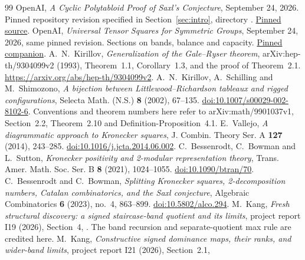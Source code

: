 \documentclass[11pt]{article}
\theoremstyle{remark}\newtheorem{remark}[theorem]{Remark}
\numberwithin{equation}{section}\setlength{\emergencystretch}{2em}
\begin{document}
\begin{thebibliography}{99}\small
{} OpenAI, \emph{A Cyclic Polytabloid Proof of Saxl's Conjecture},
September 24, 2026. Pinned repository revision specified in
Section~\ref{sec:intro}, directory
.
\href{https://github.com/openai/math/tree/fd4aeeb2ee4fc729c18d98444fed42fd0529eeeb/preprints/A-Cyclic-Polytabloid-Proof-of-Saxls-Conjecture-September-24-2026}{Pinned source}.
 OpenAI, \emph{Universal Tensor Squares for Symmetric Groups},
September 24, 2026, same pinned revision. Sections on bands, balance and capacity.
\href{https://github.com/openai/math/tree/fd4aeeb2ee4fc729c18d98444fed42fd0529eeeb/preprints/Universal-Tensor-Squares-for-Symmetric-Groups-September-24-2026}{Pinned companion}.
 A.~N.~Kirillov, \emph{Generalization of the Gale--Ryser theorem},
arXiv:hep-th/9304099v2 (1993), Theorem~1.1, Corollary~1.3, and the proof
of Theorem~2.1. \url{https://arxiv.org/abs/hep-th/9304099v2}.
 A.~N.~Kirillov, A.~Schilling and M.~Shimozono,
\emph{A bijection between Littlewood--Richardson tableaux and rigged configurations},
Selecta Math. (N.S.) \textbf{8} (2002), 67--135.
\href{https://doi.org/10.1007/s00029-002-8102-6}{doi:10.1007/s00029-002-8102-6}.
Conventions and theorem numbers here refer to arXiv:math/9901037v1,
Section~2.2, Theorem~2.10 and Definition-Proposition~4.1.
 E.~Vallejo, \emph{A diagrammatic approach to Kronecker squares},
J. Combin. Theory Ser. A \textbf{127} (2014), 243--285.
\href{https://doi.org/10.1016/j.jcta.2014.06.002}{doi:10.1016/j.jcta.2014.06.002}.
 C.~Bessenrodt, C.~Bowman and L.~Sutton,
\emph{Kronecker positivity and 2-modular representation theory},
Trans. Amer. Math. Soc. Ser. B \textbf{8} (2021), 1024--1055.
\href{https://doi.org/10.1090/btran/70}{doi:10.1090/btran/70}.
 C.~Bessenrodt and C.~Bowman,
\emph{Splitting Kronecker squares, 2-decomposition numbers, Catalan
combinatorics, and the Saxl conjecture}, Algebraic Combinatorics
\textbf{6} (2023), no.~4, 863--899.
\href{https://doi.org/10.5802/alco.294}{doi:10.5802/alco.294}.
 M.~Kang, \emph{Fresh structural discovery: a signed staircase-band
quotient and its limits}, project report I19 (2026), Section~4,
.
The band recursion and separate-quotient max rule are credited here.
 M.~Kang, \emph{Constructive signed dominance maps, their ranks,
and wider-band limits}, project report I21 (2026), Section~2.1,

\end{thebibliography}
\end{document}

